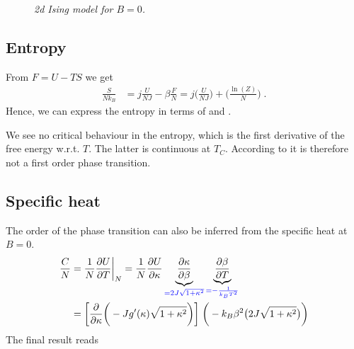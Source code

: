 %
\begin{figure}[t]
\caption{{\it 2d Ising model for $B=0$.}\label{fig:graph:ising:int:energy}}
\end{figure}




\subsection{Entropy}
%
%

%

From $F=U-TS$ we get
\begin{align*}
\frac{S}{N k_{B}} &= j \frac{U}{N J} - \beta \frac{F}{N }
= j \bigg(\frac{U}{N J} \bigg)+\bigg( \frac{\ln(Z)}{N}\bigg)\;.
\end{align*}
%
Hence, we  can express the entropy in terms of  and 
.


We see no critical behaviour in the entropy, which is   the first derivative of the free energy w.r.t. $T$. The latter is continuous at $T_{C}$. According to 
 it is therefore not a first order phase transition.

\subsection{Specific heat \label{sec:Ising:2D:spec:heat}}

The order of the phase transition can also be inferred from the specific heat at $B=0$.
%
\begin{align*}
\frac{C}{N} &= \frac{1}{N}\frac{\partial U}{\partial T}\bigg|_{N} 
=\frac{1}{N} \frac{\partial U}{\partial \kappa} 
\underbrace{
\frac{\partial \kappa}{\partial \beta }
}_{\color{blue} =   2J \sqrt{1+\kappa^{2}} }
\underbrace{
\frac{\partial \beta}{\partial T}
}_{\color{blue} = -\frac{1}{k_{B}T^{2}} }\\
&= 
\bigg[\frac{\partial}{\partial \kappa}\bigg(- J g'(\kappa) \sqrt{1+\kappa^{2}} \bigg)\bigg]\;
\bigg(-k_{B}\beta^{2}\big( 2J \sqrt{1+\kappa^{2}} \big)  \bigg)
\end{align*}
%
The final result reads
%

